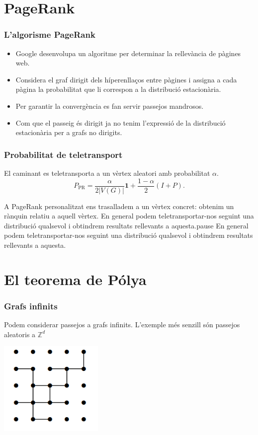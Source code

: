\documentclass[aspectratio=169, 12pt]{beamer}
\newcommand{\Z}{\mathbb{Z}}
\newcommand{\abs}[1]{\left\lvert #1 \right\rvert}
\begin{document}
\section{PageRank}
\begin{frame}
\frametitle{L'algorisme PageRank}
\begin{itemize}[<+->]
	\item Google desenvolupa un algoritme per determinar la rellevància de pàgines web. 
	\item Considera el graf dirigit dels híperenllaços entre pàgines i assigna a cada pàgina la probabilitat que li correspon a la distribució estacionària.  
	\item Per garantir la convergència es fan servir passejos mandrosos. 
	\item Com que el passeig és dirigit ja no tenim l'expressió de la distribució estacionària per a grafs no dirigits.
\end{itemize}
\end{frame}

\begin{frame}
\frametitle{Probabilitat de teletransport}
El caminant es teletransporta a un vèrtex aleatori amb probabilitat \( \alpha \). \pause 
\begin{equation*}
	P_\text{PR} = \frac{\alpha}{2\abs{V(G)}}\bm{1} + \frac{1 - \alpha}{2}(I + P).
\end{equation*} \pause

A PageRank personalitzat ens trasalladem a un vèrtex concret: obtenim un rànquin relatiu a aquell vèrtex. \pause En general podem teletransportar-nos seguint una distribució qualsevol i obtindrem resultats rellevants a aquesta.pause En general podem teletransportar-nos seguint una distribució qualsevol i obtindrem resultats rellevants a aquesta. 

\end{frame}

\section{El teorema de Pólya}
\begin{frame}
	\frametitle{Grafs infinits}
	Podem considerar passejos a grafs infinits. L'exemple més senzill són passejos aleatoris a \( \Z^d \)

	\centering
	\includegraphics[width=50mm]{reticle.png}
\end{frame}
\end{document}

